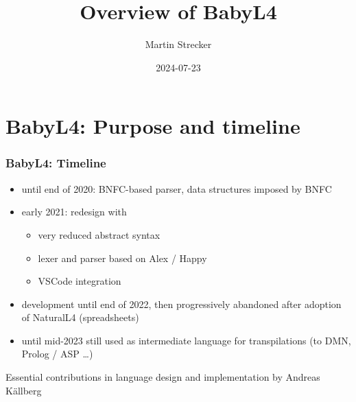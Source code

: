 \documentclass{beamer}
\title{Overview of BabyL4}
\author{Martin Strecker}
\date{2024-07-23}
\begin{document}

\begin{frame}
  \titlepage
\end{frame}


\section{BabyL4: Purpose and timeline}


\begin{frame}[fragile]\frametitle{BabyL4: Timeline}

  \begin{itemize}
  \item until end of 2020: BNFC-based parser, data structures imposed by BNFC
  \item early 2021: redesign with
    \begin{itemize}
    \item very reduced abstract syntax
    \item lexer and parser based on Alex / Happy
    \item VSCode integration
    \end{itemize}
  \item development until end of 2022, then progressively abandoned after
    adoption of NaturalL4 (spreadsheets)
  \item until mid-2023 still used as intermediate language for transpilations (to DMN, Prolog
    / ASP \dots)
  \end{itemize}

Essential contributions in language design and implementation by Andreas Källberg

\end{frame}
\end{document}
